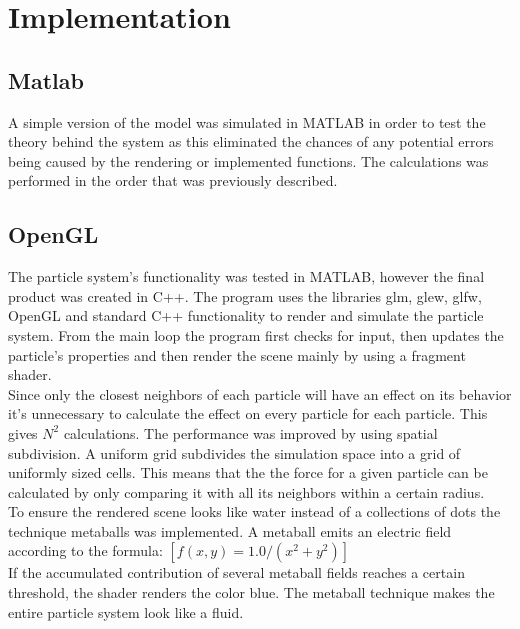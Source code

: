 \documentclass[a4paper,12pt,twoside,final]{report}
\begin{document}
\chapter{Implementation}

\section{Matlab}
A simple version of the model was simulated in MATLAB in order to test the theory behind the system as this eliminated the chances of any potential errors being caused by the rendering or implemented functions. The calculations was performed in the order that was previously described.

\section{OpenGL}
The particle system’s functionality was tested in MATLAB, however the final product was created in C++. The program uses the libraries glm, glew, glfw, OpenGL and standard C++ functionality to render and simulate the particle system. From the main loop the program first checks for input, then updates the particle’s properties and then render the scene mainly by using a fragment shader. \\

\noindent Since only the closest neighbors of each particle will have an effect on its behavior it’s unnecessary to calculate the effect on every particle for each particle. This gives $N^2$ calculations. The performance was improved by using spatial subdivision. A uniform grid subdivides the simulation space into a grid of uniformly sized cells. This means that the the force for a given particle can be calculated by only comparing it with all its neighbors within a certain radius. \\

\noindent To ensure the rendered scene looks like water instead of a collections of dots the technique metaballs was implemented. A metaball emits an electric field according to the formula: $[f(x,y) = 1.0 / (x^2 + y^2)]$ \\

\noindent  If the accumulated contribution of several metaball fields reaches a certain threshold, the shader renders the color blue. The metaball technique makes the entire particle system look like a fluid.
\end{document}

